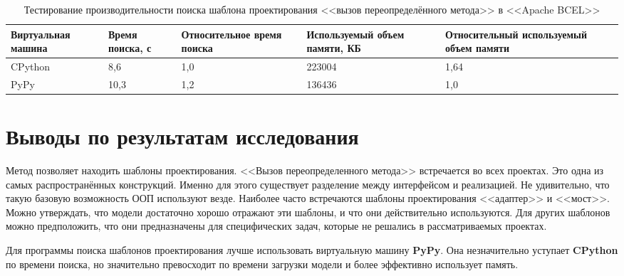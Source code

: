 \begin{table}[ht!]
    \centering
    \begin{tabularx}{\textwidth}{|X|X|X|X|X|}
        \hline
        Виртуальная машина & Время поиска, с & Относительное время поиска & Используемый объем памяти, КБ & Относительный используемый объем памяти \\
        \hline
        CPython & 8,6 & 1,0 & 223004 & 1,64 \\
        \hline
        PyPy & 10,3 & 1,2 & 136436 & 1,0 \\
        \hline
    \end{tabularx}
    \caption{Тестирование производительности поиска шаблона проектирования <<вызов переопределённого метода>> в <<Apache BCEL>>}
    \label{table:find-pattern}
\end{table}

\section{Выводы по результатам исследования}

Метод позволяет находить шаблоны проектирования.
<<Вызов переопределенного метода>> встречается во всех проектах.
Это одна из самых распространённых конструкций.
Именно для этого существует разделение между интерфейсом и реализацией.
Не удивительно, что такую базовую возможность ООП используют везде.
Наиболее часто встречаются шаблоны проектирования <<адаптер>> и <<мост>>.
Можно утверждать, что модели достаточно хорошо отражают эти шаблоны, и что
они действительно используются.
Для других шаблонов можно предположить, что они предназначены для специфических задач,
которые не решались в рассматриваемых проектах.

Для программы поиска шаблонов проектирования лучше использовать виртуальную машину
\textbf{PyPy}.
Она незначительно уступает \textbf{CPython} по времени поиска, но значительно
превосходит по времени загрузки модели и более эффективно использует память.
